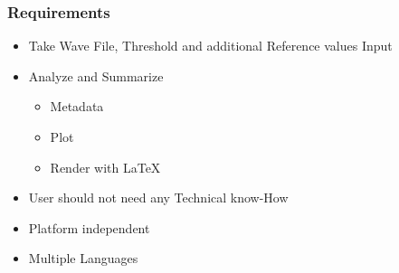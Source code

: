 \begin{frame}
    \frametitle{Requirements}
    \begin{itemize}[<+->]
        \large
        \item Take Wave File, Threshold and additional Reference values Input
        \item Analyze and Summarize 
        \begin{itemize}
            \large
            \item Metadata
            \item Plot
            \item Render with LaTeX
        \end{itemize}
        \item User should not need any Technical know-How
        \item Platform independent
        \item Multiple Languages
    \end{itemize}
\end{frame}

